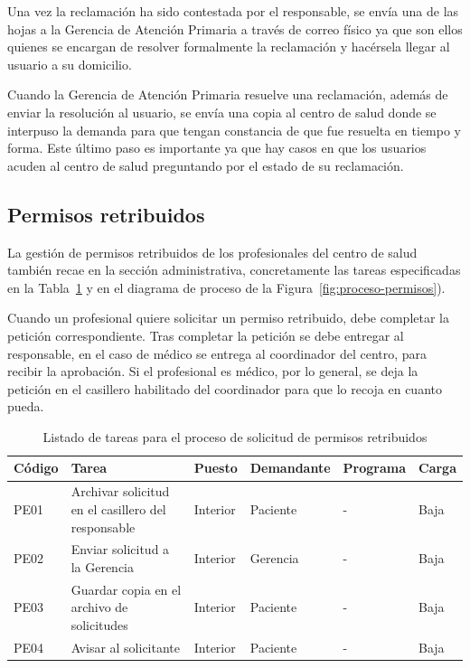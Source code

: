 Una vez la reclamación ha sido contestada por el responsable, se envía una de las hojas a la Gerencia de Atención Primaria a través de correo físico ya que son ellos quienes se encargan de resolver formalmente la reclamación y hacérsela llegar al usuario a su domicilio.

Cuando la Gerencia de Atención Primaria resuelve una reclamación, además de enviar la resolución al usuario, se envía una copia al centro de salud donde se interpuso la demanda para que tengan constancia de que fue resuelta en tiempo y forma.
Este último paso es importante ya que hay casos en que los usuarios acuden al centro de salud preguntando por el estado de su reclamación.

\subsection{Permisos retribuidos}

La gestión de permisos retribuidos de los profesionales del centro de salud también recae en la sección administrativa, concretamente las tareas especificadas en la Tabla~\ref{tab:proceso-permisos} y en el diagrama de proceso de la Figura~\ref{fig:proceso-permisos}).

Cuando un profesional quiere solicitar un permiso retribuido, debe completar la petición correspondiente.
Tras completar la petición se debe entregar al responsable, en el caso de médico se entrega al coordinador del centro, para recibir la aprobación.
Si el profesional es médico, por lo general, se deja la petición en el casillero habilitado del coordinador para que lo recoja en cuanto pueda.

\begin{table}[H]
    \begin{tabular}{lp{5cm}llll}
        \toprule
        Código & Tarea                                              & Puesto   & Demandante & Programa & Carga \\
        \midrule
        PE01   & Archivar solicitud en el casillero del responsable & Interior & Paciente   & -        & Baja  \\
        PE02   & Enviar solicitud a la Gerencia                     & Interior & Gerencia   & -        & Baja  \\
        PE03   & Guardar copia en el archivo de solicitudes         & Interior & Paciente   & -        & Baja  \\
        PE04   & Avisar al solicitante                              & Interior & Paciente   & -        & Baja  \\
        \bottomrule
    \end{tabular}
    \caption{Listado de tareas para el proceso de solicitud de permisos retribuidos}
    \label{tab:proceso-permisos}
\end{table}

